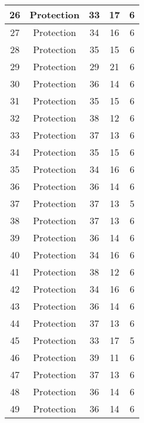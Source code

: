 \documentclass[results.tex]{subfiles}
\begin{document}
\begin{center}
\begin{tabular}{| c || c | c | c | c |}
    \hline
    26 & Protection & 33 & 17 & 6 \\ 
    \hline
    27 & Protection & 34 & 16 & 6 \\ 
    \hline
    28 & Protection & 35 & 15 & 6 \\ 
    \hline
    29 & Protection & 29 & 21 & 6 \\ 
    \hline
    30 & Protection & 36 & 14 & 6 \\ 
    \hline
    31 & Protection & 35 & 15 & 6 \\ 
    \hline
    32 & Protection & 38 & 12 & 6 \\ 
    \hline
    33 & Protection & 37 & 13 & 6 \\ 
    \hline
    34 & Protection & 35 & 15 & 6 \\ 
    \hline
    35 & Protection & 34 & 16 & 6 \\ 
    \hline
    36 & Protection & 36 & 14 & 6 \\ 
    \hline
    37 & Protection & 37 & 13 & 5 \\ 
    \hline
    38 & Protection & 37 & 13 & 6 \\ 
    \hline
    39 & Protection & 36 & 14 & 6 \\ 
    \hline
    40 & Protection & 34 & 16 & 6 \\ 
    \hline
    41 & Protection & 38 & 12 & 6 \\ 
    \hline
    42 & Protection & 34 & 16 & 6 \\ 
    \hline
    43 & Protection & 36 & 14 & 6 \\ 
    \hline
    44 & Protection & 37 & 13 & 6 \\ 
    \hline
    45 & Protection & 33 & 17 & 5 \\ 
    \hline
    46 & Protection & 39 & 11 & 6 \\ 
    \hline
    47 & Protection & 37 & 13 & 6 \\ 
    \hline
    48 & Protection & 36 & 14 & 6 \\ 
    \hline
    49 & Protection & 36 & 14 & 6 \\ 
    \hline   \end{tabular}
\end{center}
\end{document}
